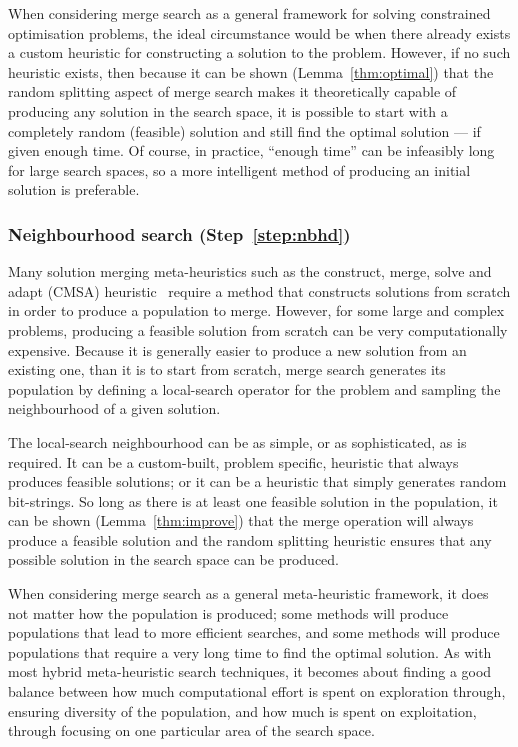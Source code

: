 \documentclass[journal]{IEEEtran}
\begin{document}
When considering merge search as a general framework for solving constrained optimisation problems, the ideal circumstance would be when there already exists a custom heuristic for constructing a solution to the problem. However, if no such heuristic exists, then because it can be shown (Lemma~\ref{thm:optimal}) that the random splitting aspect of merge search makes it theoretically capable of producing any solution in the search space, it is possible to start with a completely random (feasible) solution and still find the optimal solution --- if given enough time. Of course, in practice, ``enough time'' can be infeasibly long for large search spaces, so a more intelligent method of producing an initial solution is preferable.

\subsubsection*{\textbf{Neighbourhood search (Step~\ref{step:nbhd})}}

Many solution merging meta-heuristics such as the construct, merge, solve and adapt (CMSA) heuristic~\cite{cmsa} require a method that constructs solutions from scratch in order to produce a population to merge. However, for some large and complex problems, producing a feasible solution from scratch can be very computationally expensive. Because it is generally easier to produce a new solution from an existing one, than it is to start from scratch, merge search generates its population by defining a local-search operator for the problem and sampling the neighbourhood of a given solution.

The local-search neighbourhood can be as simple, or as sophisticated, as is required. It can be a custom-built, problem specific, heuristic that always produces feasible solutions; or it can be a heuristic that simply generates random bit-strings. So long as there is at least one feasible solution in the population, it can be shown (Lemma~\ref{thm:improve}) that the merge operation will always produce a feasible solution and the random splitting heuristic ensures that any possible solution in the search space can be produced.

When considering merge search as a general meta-heuristic framework, it does not matter how the population is produced; some methods will produce populations that lead to more efficient searches, and some methods will produce populations that require a very long time to find the optimal solution. As with most hybrid meta-heuristic search techniques, it becomes about finding a good balance between how much computational effort is spent on exploration through, ensuring diversity of the population, and how much is spent on exploitation, through focusing on one particular area of the search space.
\end{document}

